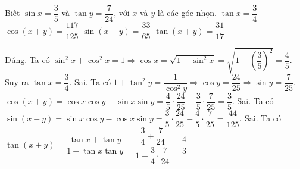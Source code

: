 \begin{ex}%
Biết $\sin x=\dfrac{3}{5}$ và $\tan y=\dfrac{7}{24}$, với $x$ và $y$ là các góc nhọn.
\choiceTF
{\True $\tan x=\dfrac{3}{4}$}
{$\cos (x+y)=\dfrac{117}{125}$}
{$\sin (x-y)=\dfrac{33}{65}$}
{$\tan (x+y)=\dfrac{31}{17}$}
\loigiai
{
\begin{itemchoice}
\itemch Đúng. Ta có $\sin ^2 x+\cos ^2 x=1 \Rightarrow \cos x=\sqrt{1-\sin ^2 x}=\sqrt{1-\left(\dfrac{3}{5}\right)^2}=\dfrac{4}{5}$.\\
Suy ra $\tan x=\dfrac{3}{4}$.
\itemch Sai.
Ta có $1+\tan ^2 y=\dfrac{1}{\cos ^2 y} \Rightarrow \cos y=\dfrac{24}{25} \Rightarrow \sin y=\dfrac{7}{25}$.
$\cos (x+y)=\cos x \cos y-\sin x \sin y=\dfrac{4}{5} \cdot \dfrac{24}{25}-\dfrac{3}{5} \cdot \dfrac{7}{25}=\dfrac{3}{5}$.
\itemch Sai. Ta có $\sin (x-y)=\sin x \cos y-\cos x \sin y=\dfrac{3}{5} \cdot \dfrac{24}{25}-\dfrac{4}{5} \cdot \dfrac{7}{25}=\dfrac{44}{125}$.
\itemch Sai. Ta có $\tan (x+y)=\dfrac{\tan x+\tan y}{1-\tan x \tan y}=\dfrac{\dfrac{3}{4}+\dfrac{7}{24}}{1-\dfrac{3}{4} \cdot \dfrac{7}{24}}=\dfrac{4}{3}$
\end{itemchoice}
}
\end{ex}


